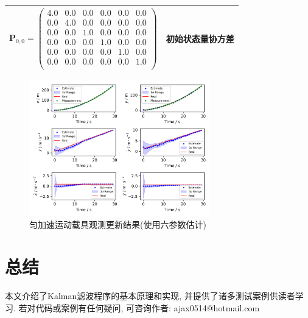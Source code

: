 \documentclass[12pt]{article}
\begin{document}
\begin{table}[htbp]
\begin{tabular}{cc}
$\bm{P}_{0,0} =  
   \begin{pmatrix} %
      4.0 & 0.0 & 0.0 & 0.0 & 0.0 & 0.0 \\
      0.0 & 4.0 & 0.0 & 0.0 & 0.0 & 0.0 \\
      0.0 & 0.0 & 1.0 & 0.0 & 0.0 & 0.0 \\
      0.0 & 0.0 & 0.0 & 1.0 & 0.0 & 0.0 \\
      0.0 & 0.0 & 0.0 & 0.0 & 1.0 & 0.0 \\ 
      0.0 & 0.0 & 0.0 & 0.0 & 0.0 & 1.0 \\
   \end{pmatrix}$ & 初始状态量协方差 \\
\hline 
\end{tabular}
\end{table}

\begin{figure}[htbp] %
   \centering
   \includegraphics[width=0.7\textwidth]{./figures/exp3_3} 
   \caption{匀加速运动载具观测更新结果(使用六参数估计)}
   \label{fig:exp3_3}
\end{figure}

\section{总结}

本文介绍了Kalman滤波程序的基本原理和实现, 并提供了诸多测试案例供读者学习. 若对代码或案例有任何疑问, 可咨询作者: ajax0514@hotmail.com
\end{document}
